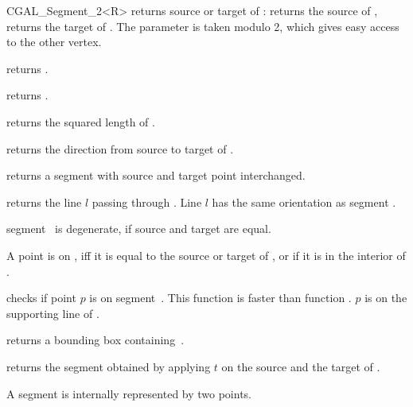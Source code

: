 \begin{ccClassTemplate} {CGAL_Segment_2<R>}
       {returns source or target   of \ccVar:    returns
        the source of \ccVar,  returns the target of \ccVar. 
        The parameter  is taken modulo 2, which gives 
        easy access to the other vertex. }

	{returns .}

       {returns .}

       {returns the squared length of \ccVar. }

       {returns the direction from source to target of \ccVar.}


       {returns a segment with source and target point interchanged.}

       {returns the line $l$ passing through \ccVar. Line $l$  has the
same orientation as segment \ccVar.}

       {segment \ccVar\ is degenerate, if source and target are equal.}

       {}

       {}

       {A point is on \ccVar, iff it is equal to the source or target 
        of \ccVar, or if it is in the interior of \ccVar.}

       {checks if point $p$ is on segment~\ccVar. This function is faster
        than function .
        \ccPrecond $p$ is on the supporting line of \ccVar.}

       {returns a bounding box containing~\ccVar.}

       {returns the segment obtained by applying $t$ on the source
        and the target of \ccVar.}

\ccImplementation
A segment is internally represented by two points. 


\end{ccClassTemplate} 

%
%
%
%
